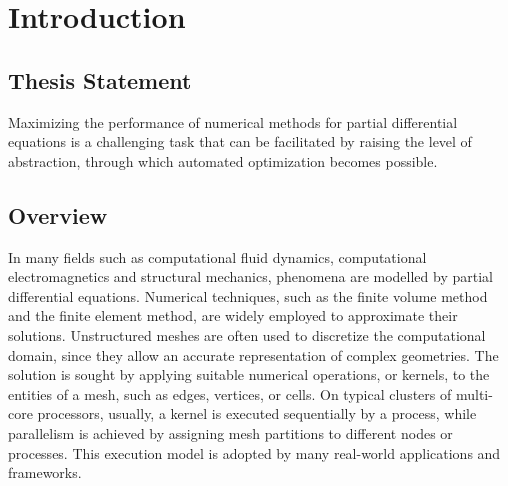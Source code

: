 \chapter{Introduction}

\section{Thesis Statement}




Maximizing the performance of numerical methods for partial differential equations is a challenging task that can be facilitated by raising the level of abstraction, through which automated optimization becomes possible.

\section{Overview}
In many fields such as computational fluid dynamics, computational electromagnetics and structural mechanics, phenomena are modelled by partial differential equations. Numerical techniques, such as the finite volume method and the finite element method, are widely employed to approximate their solutions. Unstructured meshes are often used to discretize the computational domain, since they allow an accurate representation of complex geometries. The solution is sought by applying suitable numerical operations, or kernels, to the entities of a mesh, such as edges, vertices, or cells. On typical clusters of multi-core processors, usually, a kernel is executed sequentially by a process, while parallelism is achieved by assigning mesh partitions to different nodes or processes. This execution model is adopted by many real-world applications and frameworks.


